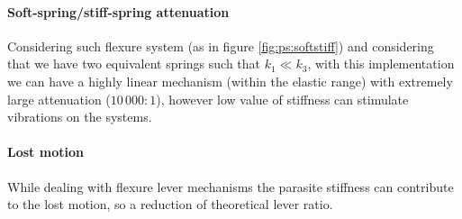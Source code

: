 		\paragraph{Soft-spring/stiff-spring attenuation} Considering such flexure system (as in figure \ref{fig:ps:softstiff}) and considering that we have two equivalent springs such that $k_1\ll k_3$, with this implementation we can have a highly linear mechanism (within the elastic range) with extremely large attenuation ($10\,000:1$), however low value of stiffness can stimulate vibrations on the systems.
	
		\paragraph{Lost motion} While dealing with flexure lever mechanisms the parasite stiffness can contribute to the lost motion, so a reduction of theoretical lever ratio.
	
	
	
	
	